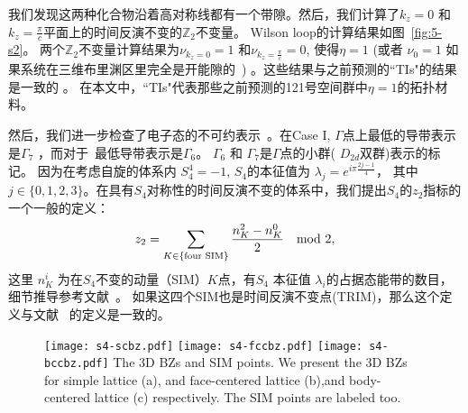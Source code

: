 我们发现这两种化合物沿着高对称线都有一个带隙。然后，我们计算了$k_z=0$ 和 $k_z=\frac{\pi}{c}$平面上的时间反演不变的$\mathbb Z_2$不变量。 
Wilson loop的计算结果如图~\ref{fig:5-s2}。
两个$\mathbb Z_2$不变量计算结果为$\nu_{k_z=0}=1$ 和$\nu_{k_z=\frac{\pi}{c}}=0$, 使得$\eta=1$ (或者 $\nu_0=1$ 如果系统在三维布里渊区里完全是开能隙的~\citep{Fu2007topo}) 。这些结果与之前预测的``TIs"的结果是一致的 \citep{Wang2010}。 在本文中，``TIs"代表那些之前预测的121号空间群中$\eta=1$的拓扑材料。

然后，我们进一步检查了电子态的不可约表示~\citep{Gao2020}。在Case I, $\Gamma$点上最低的导带表示是$\Gamma_7$ ，而对于\wsm~最低导带表示是$\Gamma_6$。
$\Gamma_6$ 和 $\Gamma_7$是$\Gamma$点的小群( $D_{2d}$双群)表示的标记。
因为在考虑自旋的体系内 $S_4^4=-1$, $S_4$的本征值为 $\lambda_j=e^{i\pi\frac{2j-1}{4}}$， 其中 $j\in\{0,1,2,3\}$。在具有$S_4$对称性的时间反演不变的体系中，我们提出$S_4$的$z_2$指标的一个一般的定义：
\begin{equation}
  z_2 = \sum_{K\in\{\text{four SIM}\}}\frac{n_K^{2} - n_K^{0}}{2} \quad{\rm mod} \ 2 ,
\end{equation}
这里 $n_K^{i}$ 为在$S_4$不变的动量（SIM）$K$点，有$S_4$ 本征值 $\lambda_i$的占据态能带的数目，细节推导参考文献~\cite{tobedone2019}。
如果这四个SIM也是时间反演不变点(TRIM)，那么这个定义与文献~\citep{song2017,haruki2018} 的定义是一致的。

\begin{figure}[!htb]
\centering
\texttt{[image: s4-scbz.pdf]}
\texttt{[image: s4-fccbz.pdf]}
\texttt{[image: s4-bccbz.pdf]}
{
The 3D BZs and SIM points. We present the 3D BZs for simple lattice (a), and face-centered lattice (b),and body-centered lattice (c)  respectively. The SIM points are labeled too. ~\citep{Qians4}
}
\label{fig:5-bz}
\end{figure}

